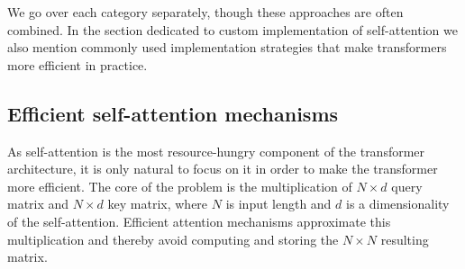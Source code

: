 We go over each category separately, though these approaches are often
combined. In the section dedicated to custom implementation of self-attention
we also mention commonly used implementation strategies that make transformers
more efficient in practice.

\subsection{Efficient self-attention mechanisms}











As self-attention is the most resource-hungry component of the transformer
architecture, it is only natural to focus on it in order to make the transformer
more efficient. The core of the problem is the multiplication of $N\times d$
query matrix and $N\times d$ key matrix, where $N$ is input length and $d$ is a
dimensionality of the self-attention. Efficient attention mechanisms approximate
this multiplication and thereby avoid computing and storing the $N\times N$
resulting matrix.


